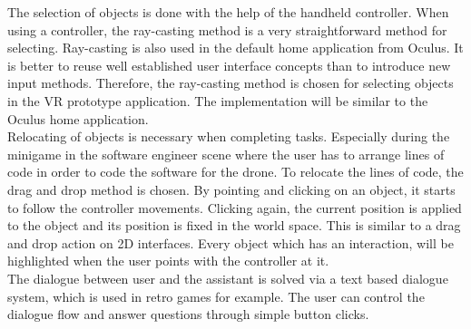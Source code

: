 The selection of objects is done with the help of the handheld controller. When using a controller, the ray-casting method is a very straightforward method for selecting. Ray-casting is also used in the default home application from Oculus. It is better to reuse well established user interface concepts than to introduce new input methods. Therefore, the ray-casting method is chosen for selecting objects in the VR prototype application. The implementation will be similar to the Oculus home application.\\
Relocating of objects is necessary when completing tasks. Especially during the minigame in the software engineer scene where the user has to arrange lines of code in order to code the software for the drone. To relocate the lines of code, the drag and drop method is chosen. By pointing and clicking on an object, it starts to follow the controller movements. Clicking again, the current position is applied to the object and its position is fixed in the world space. This is similar to a drag and drop action on 2D interfaces. Every object which has an interaction, will be highlighted when the user points with the controller at it.\\
The dialogue between user and the assistant is solved via a text based dialogue system, which is used in retro games for example. The user can control the dialogue flow and answer questions through simple button clicks.

